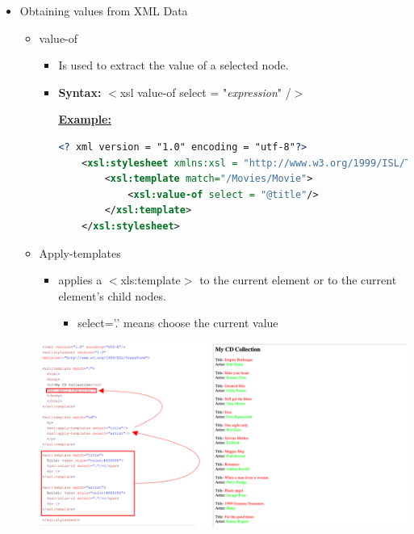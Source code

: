 \documentclass[12pt]{article}
\begin{document}
\begin{enumerate}[1.]
\begin{enumerate}[a)]
\begin{itemize}
            \item Obtaining values from XML Data
            \begin{itemize}
                \item value-of
                \begin{itemize}
                    \item Is used to extract the value of a selected node.
                    \item \textbf{Syntax:} $<$xsl value-of select = "\textit{expression}" /$>$


                    \bigskip

                    \underline{\textbf{Example:}}

    \begin{lstlisting}[language=XML]
    <? xml version = "1.0" encoding = "utf-8"?>
    <xsl:stylesheet xmlns:xsl = "http://www.w3.org/1999/ISL/Transform">
        <xsl:template match="/Movies/Movie">
            <xsl:value-of select = "@title"/>
        </xsl:template>
    </xsl:stylesheet>
    \end{lstlisting}
                \end{itemize}

                \item Apply-templates
                \begin{itemize}
                    \item applies a $<$xls:template$>$ to the current element or
                    to the current element's child nodes.
                    \begin{itemize}
                        \item select='.' means choose the current value
                    \end{itemize}
                \end{itemize}

                \begin{center}
                \includegraphics[width=\linewidth]{images/worksheet_11_solution_1.png}
                \end{center}


\end{itemize}
\end{itemize}
\end{enumerate}
\end{enumerate}
\end{document}
